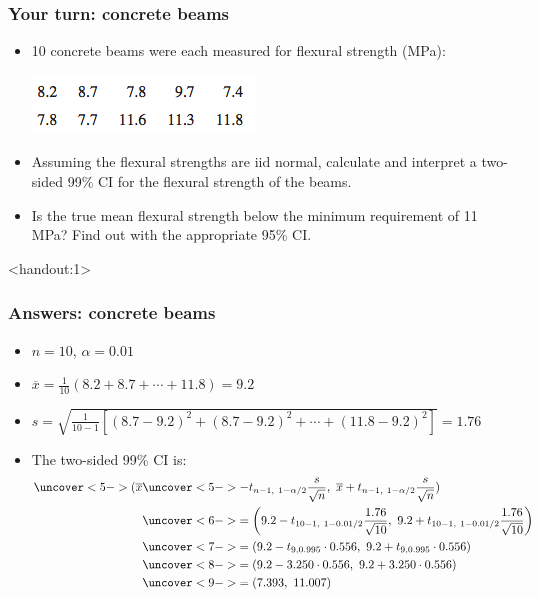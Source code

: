 \documentclass[handout]{beamer}\usepackage{graphicx, color}
\newcommand{\answers}{1}
\providecommand{\ov}[1]{\overline{#1}}
\numberwithin{equation}{section}
\begin{document}
\begin{frame}
\frametitle{Your turn: concrete beams}
\begin{itemize}
\item 10 concrete beams were each measured for flexural strength (MPa):
\begin{center}
 \includegraphics{../../fig/fbeams.png}
\end{center}
\pause \item Assuming the flexural strengths are iid normal, calculate and interpret a two-sided 99\% CI for the flexural strength of the beams.
\pause \item Is the true mean flexural strength below the minimum requirement of 11 MPa? Find out with the appropriate 95\% CI.
\end{itemize}
\end{frame}

\begin{frame}<handout:\answers>
\frametitle{Answers: concrete beams} \scriptsize
\begin{itemize}
\item $n = 10$, $\alpha = 0.01$
\pause \item $\ov{x} = \frac{1}{10}(8.2 + 8.7 + \cdots + 11.8) = 9.2$
\pause \item $s = \sqrt{\frac{1}{10-1} [(8.7 - 9.2)^2 + (8.7 - 9.2)^2 + \cdots + (11.8-9.2)^2]} = 1.76$
\pause \item The two-sided 99\% CI is:
\begin{align*}
\uncover<5->{(\ov{x}}& \uncover<5->{ - t_{n - 1, \ 1 - \alpha/2} \frac{s}{\sqrt{n}},\ \ov{x} + t_{n - 1, \ 1- \alpha/2 } \frac{s}{\sqrt{n}})} \\
&\uncover<6->{= \left (9.2 - t_{10 - 1, \ 1 - 0.01/2} \frac{1.76}{\sqrt{10}}, \ 9.2 + t_{10 - 1, \ 1 - 0.01/2} \frac{1.76}{\sqrt{10}} \right )} \\
&\uncover<7->{= (9.2 - t_{9, 0.995} \cdot 0.556, \ 9.2 + t_{9, 0.995} \cdot 0.556)} \\
&\uncover<8->{= (9.2 - 3.250 \cdot 0.556, \ 9.2 + 3.250 \cdot 0.556)} \\
&\uncover<9->{= (7.393, \ 11.007)}
\end{align*}
\end{itemize}
\end{frame}
\end{document}
